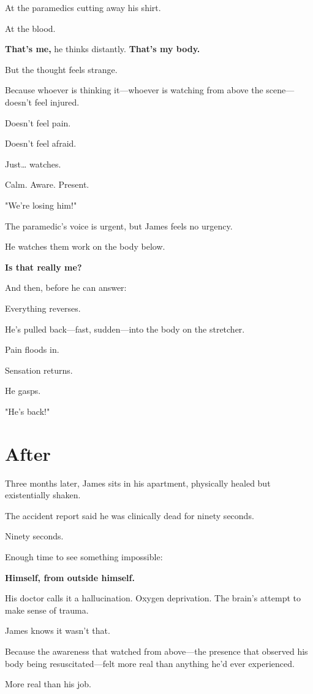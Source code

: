 \documentclass[11pt,twoside]{book}
\begin{document}
At the paramedics cutting away his shirt.

At the blood.

\textbf{That's me,} he thinks distantly. \textbf{That's my body.}

But the thought feels strange.

Because whoever is thinking it—whoever is watching from above the scene—doesn't feel injured.

Doesn't feel pain.

Doesn't feel afraid.

Just\ldots{} watches.

Calm. Aware. Present.

"We're losing him!"

The paramedic's voice is urgent, but James feels no urgency.

He watches them work on the body below.

\textbf{Is that really me?}

And then, before he can answer:

Everything reverses.

He's pulled back—fast, sudden—into the body on the stretcher.

Pain floods in.

Sensation returns.

He gasps.

"He's back!"

\section*{After}

Three months later, James sits in his apartment, physically healed but existentially shaken.

The accident report said he was clinically dead for ninety seconds.

Ninety seconds.

Enough time to see something impossible:

\textbf{Himself, from outside himself.}

His doctor calls it a hallucination. Oxygen deprivation. The brain's attempt to make sense of trauma.

James knows it wasn't that.

Because the awareness that watched from above—the presence that observed his body being resuscitated—felt more real than anything he'd ever experienced.

More real than his job.
\end{document}
